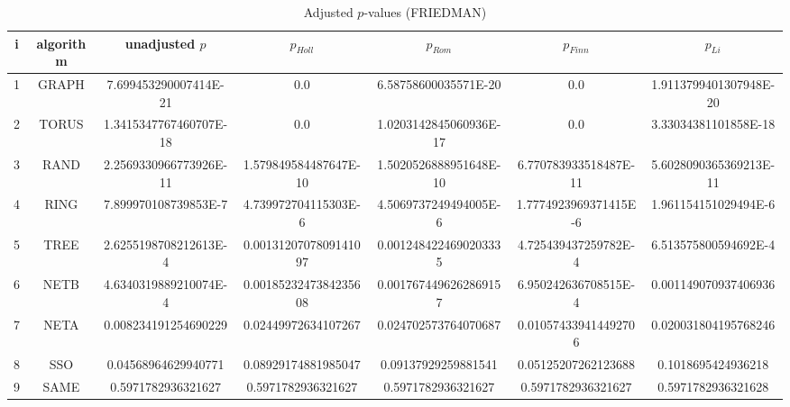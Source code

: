\documentclass[a4paper,10pt]{article}
\begin{document}
\begin{landscape}
\begin{table}[!htp]
\centering\scriptsize
\caption{Adjusted $p$-values (FRIEDMAN)}
\begin{tabular}{ccccccc}
i&algorithm&unadjusted $p$&$p_{Holl}$&$p_{Rom}$&$p_{Finn}$&$p_{Li}$\\
\hline
1& GRAPH&7.699453290007414E-21&0.0&6.58758600035571E-20&0.0&1.9113799401307948E-20\\
2& TORUS&1.3415347767460707E-18&0.0&1.0203142845060936E-17&0.0&3.33034381101858E-18\\
3& RAND&2.2569330966773926E-11&1.579849584487647E-10&1.5020526888951648E-10&6.770783933518487E-11&5.6028090365369213E-11\\
4& RING&7.899970108739853E-7&4.739972704115303E-6&4.5069737249494005E-6&1.7774923969371415E-6&1.961154151029494E-6\\
5& TREE&2.6255198708212613E-4&0.0013120707809141097&0.0012484224690203335&4.725439437259782E-4&6.513575800594692E-4\\
6& NETB&4.6340319889210074E-4&0.0018523247384235608&0.0017674496262869157&6.950242636708515E-4&0.001149070937406936\\
7& NETA&0.008234191254690229&0.02449972634107267&0.024702573764070687&0.010574339414492706&0.020031804195768246\\
8& SSO&0.04568964629940771&0.08929174881985047&0.09137929259881541&0.05125207262123688&0.1018695424936218\\
9& SAME&0.5971782936321627&0.5971782936321627&0.5971782936321627&0.5971782936321627&0.5971782936321628\\
\hline
\end{tabular}
\end{table}


\newpage


\end{landscape}
\end{document}
